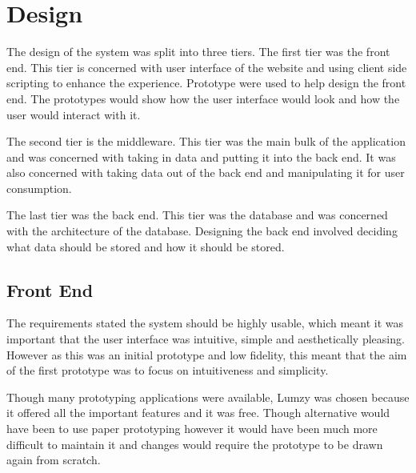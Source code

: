 \documentclass[a4paper,oneside,11pt]{report}
\begin{document}
\section{Design}
The design of the system was split into three tiers. The first tier was the front end. This tier is concerned with user interface of the website and using client side scripting to enhance the experience. Prototype were used to help design the front end. The prototypes would show how the user interface would look and how the user would interact with it. 

The second tier is the middleware. This tier was the main bulk of the application and was concerned with taking in data and putting it into the back end. It was also concerned with taking data out of the back end and manipulating it for user consumption. 

The last tier was the back end. This tier was the database and was concerned with the architecture of the database. Designing the back end involved deciding what data should be stored and how it should be stored.
\subsection{Front End}
The requirements stated the system should be highly usable, which meant it was important that the user interface was intuitive, simple and aesthetically pleasing. However as this was an initial prototype and low fidelity, this meant that the aim of the first prototype was to focus on intuitiveness and simplicity.

Though many prototyping applications were available, Lumzy was chosen because it offered all the important features and it was free. Though alternative would have been to use paper prototyping however it would have been much more difficult to maintain it and changes would require the prototype to be drawn again from scratch.

\pagebreak
\end{document}

